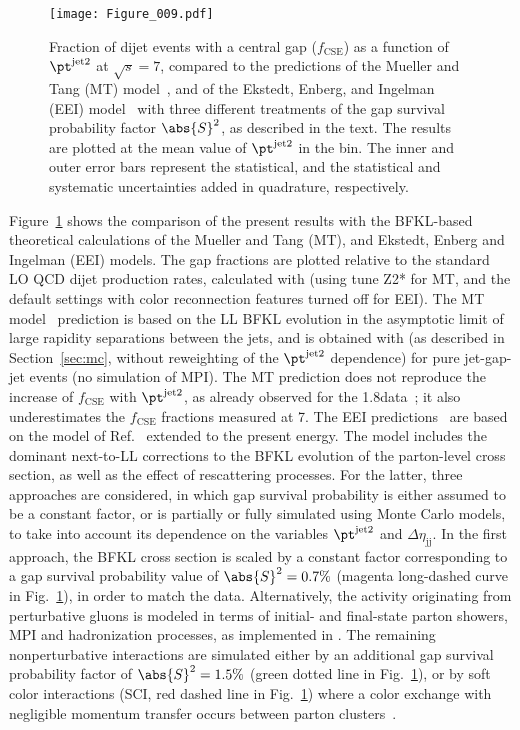 \documentclass[11pt,twoside,a4paper,cmspaper,final,collab]{cms-tdr}
\begin{document}
\begin{figure}
\centering
\texttt{[image: Figure\_009.pdf]}
\caption{Fraction of dijet events with a central gap ($f_\mathrm{CSE}$) as a function of $\pt^\text{jet2}$ at $\sqrt{s}=7$\TeV, compared to the predictions of the Mueller and Tang (MT) model~\cite{mt}, and of the Ekstedt, Enberg, and Ingelman (EEI) model~\cite{csp,cspLHC} with three different treatments of the gap survival probability factor $\abs{S}^2$, as described in the text. The results are plotted at the mean value of $\pt^\text{jet2}$ in the bin. The inner and outer error bars represent the statistical, and the statistical and systematic uncertainties added in quadrature, respectively.}
\label{cmstheory}
\end{figure}

Figure~\ref{cmstheory} shows the comparison of the present results with the BFKL-based theoretical calculations of the Mueller and Tang (MT), and Ekstedt, Enberg and Ingelman (EEI) models. The gap fractions are plotted relative to the standard LO QCD dijet production rates, calculated with  (using tune Z2* for MT, and the default settings with color reconnection features turned off for EEI). The MT model~\cite{mt} prediction is based on the LL BFKL evolution in the asymptotic limit of large rapidity separations between the jets, and is obtained with  (as described in Section~\ref{sec:mc}, without reweighting of the $\pt^\text{jet2}$ dependence) for pure jet-gap-jet events (no simulation of MPI). The MT prediction does not reproduce the increase of $f_\mathrm{CSE}$ with $\pt^\text{jet2}$, as already observed for the 1.8\TeV data~\cite{csp}; it also underestimates the $f_\mathrm{CSE}$ fractions measured at 7\TeV. The EEI predictions~\cite{cspLHC} are based on the model of Ref.~\cite{csp} extended to the present energy. The model includes the dominant next-to-LL corrections to the BFKL evolution of the parton-level cross section, as well as the effect of rescattering processes. For the latter, three approaches are considered, in which gap survival probability is either assumed to be a constant factor, or is partially or fully simulated using Monte Carlo models, to take into account its dependence on the variables $\pt^\text{jet2}$ and $\Delta\eta_\mathrm{jj}$. In the first approach, the BFKL cross section is scaled by a constant factor corresponding to a gap survival probability value of $\abs{S}^2=0.7\%$ (magenta long-dashed curve in Fig.~\ref{cmstheory}), in order to match the data. Alternatively, the activity originating from perturbative gluons is modeled in terms of initial- and final-state parton showers, MPI and hadronization processes, as implemented in . The remaining nonperturbative interactions are simulated either by an additional gap survival probability factor of $\abs{S}^2=1.5\%$ (green dotted line in Fig.~\ref{cmstheory}), or by soft color interactions (SCI, red dashed line in Fig.~\ref{cmstheory}) where a color exchange with negligible momentum transfer occurs between parton clusters~\cite{cspLHC}.
\end{document}
